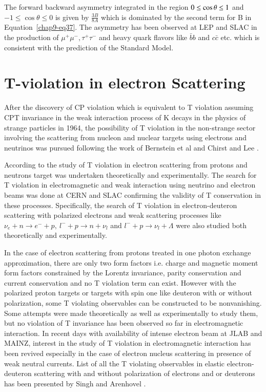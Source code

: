  The forward backward asymmetry integrated in the region $0\leq\break \cos\theta\leq 1$   and $-1\leq\cos\theta\leq 0$ is given by $\frac{3B}{8A}$ which is dominated by the second term for B in Equation~\ref{chap9-eq37}. The asymmetry has been observed at LEP and SLAC in the production of $\mu^+\mu^-,\tau^+\tau^-$ and heavy quark flavors like $\bar{b}b$ and $c\bar{c}$ etc. which is consistent with the prediction of the Standard Model. 
 
\section{T-violation in electron Scattering}\label{chap9-sec4}

After the discovery of CP violation which is equivalent to T violation assuming CPT invariance in the weak interaction process of K decays in the physics of strange particles in 1964, the possibility of T violation in the non-strange sector involving the scattering from nucleon and nuclear targets using electrons and neutrinos was pursued following the work of Bernstein et al \cite{chap9-key31} and Chirst and Lee \cite{chap9-key32}.

According to the study of T violation in electron scattering from protons and neutrons target was undertaken theoretically and experimentally. The search for T violation in electromagnetic and weak interaction using neutrino and  electron beams was done at CERN and SLAC confirming the validity of  T conservation in these processes. Specifically, the search of T violation in electron-deuteron scattering with polarized electrons and weak scattering processes like $\nu_e+n\rightarrow e^-+p, ~ l^-+p\rightarrow n+\nu_l$ and $ l^-+p\rightarrow \nu_l + \Lambda$ were also studied both theoretically and experimentally. 

In the case of electron scattering from protons treated in one photon exchange approximation, there are only two form factors i.e. charge and magnetic moment form factors constrained by the Lorentz invariance, parity conservation and current conservation and no T violation term can exist. However with the polarized proton targets or targets with spin one like deuteron with or without polarization, some T violating observables can be constructed to be nonvanishing. Some attempts were made theoretically as well as experimentally  to study them, but no violation of T invariance has been observed so far in electromagnetic interaction. In recent days with availability of intense electron beam at JLAB and MAINZ, interest in the study of T violation in electromagnetic interaction has been revived especially in the case of electron nucleus scattering in presence of weak neutral currents. List of all the T violating observables in elastic electron-deuteron scattering with and without polarization of electrons and or deuterons has been presented by Singh and Arenhovel \cite{chap9-key11}.

